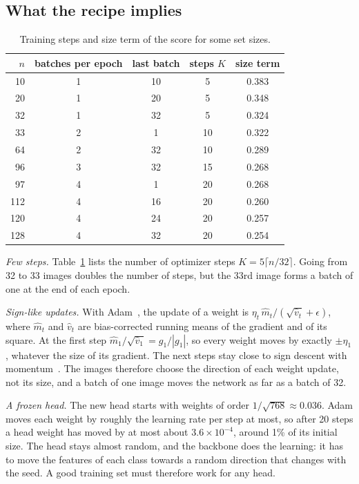 \documentclass[journal]{IEEEtran}
\begin{document}
\subsection{What the recipe implies}

\begin{table}[t]
\centering
\caption{Training steps and size term of the score for some set sizes.}
\label{tab:steps}
\begin{tabular}{rcccc}
\toprule
$n$ & batches per epoch & last batch & steps $K$ & size term \\
\midrule
10 & 1 & 10 & 5 & 0.383 \\
20 & 1 & 20 & 5 & 0.348 \\
32 & 1 & 32 & 5 & 0.324 \\
33 & 2 & 1 & 10 & 0.322 \\
64 & 2 & 32 & 10 & 0.289 \\
96 & 3 & 32 & 15 & 0.268 \\
97 & 4 & 1 & 20 & 0.268 \\
112 & 4 & 16 & 20 & 0.260 \\
120 & 4 & 24 & 20 & 0.257 \\
128 & 4 & 32 & 20 & 0.254 \\
\bottomrule
\end{tabular}
\end{table}

\emph{Few steps.} Table~\ref{tab:steps} lists the number of optimizer steps $K = 5\lceil n/32\rceil$. Going from 32
to 33 images doubles the number of steps, but the 33rd image forms a batch of one at the end of each epoch.

\emph{Sign-like updates.} With Adam~\cite{kingma2015adam}, the update of a weight is
$\eta_t\,\hat m_t/(\sqrt{\hat v_t}+\epsilon)$, where $\hat m_t$ and $\hat v_t$ are bias-corrected running means of the
gradient and of its square. At the first step $\hat m_1/\sqrt{\hat v_1} = g_1/|g_1|$, so every weight moves by
exactly $\pm\eta_1$, whatever the size of its gradient. The next steps stay close to sign descent with
momentum~\cite{balles2018dissecting,bernstein2018signsgd}. The images therefore choose the direction of each weight
update, not its size, and a batch of one image moves the network as far as a batch of 32.

\emph{A frozen head.} The new head starts with weights of order $1/\sqrt{768}\approx0.036$. Adam moves each weight
by roughly the learning rate per step at most, so after 20 steps a head weight has moved by at most about
$3.6\times10^{-4}$, around 1\% of its initial size. The head stays almost random, and the backbone does the learning: it has to move
the features of each class towards a random direction that changes with the seed. A good training set must
therefore work for any head.
\end{document}
